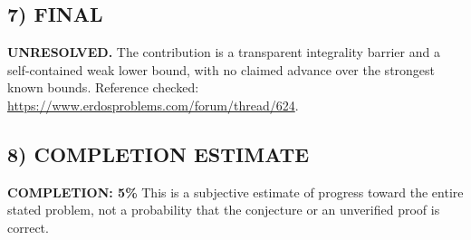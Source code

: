 \subsection*{7) FINAL}
\textbf{UNRESOLVED.} The contribution is a transparent integrality barrier and a self-contained weak lower bound, with no claimed advance over the strongest known bounds.
\noindent Reference checked: \url{https://www.erdosproblems.com/forum/thread/624}.

\subsection*{8) COMPLETION ESTIMATE}
\textbf{COMPLETION: 5\%}
This is a subjective estimate of progress toward the entire stated problem, not a probability that the conjecture or an unverified proof is correct.
